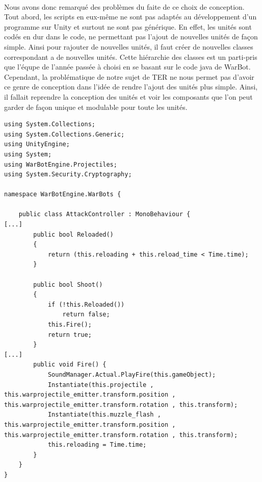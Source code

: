 \documentclass{report}
\begin{document}
\paragraph{} Nous avons donc remarqué des problèmes du faite de ce choix de conception. Tout abord, les scripts en eux-même ne sont pas adaptés au développement d'un programme sur Unity et surtout ne sont pas générique.  En effet, les unités sont codés en dur dans le code, ne permettant pas l'ajout de nouvelles unités de façon simple. Ainsi pour rajouter de nouvelles unités, il faut créer de nouvelles classes correspondant a de nouvelles unités. Cette hiérarchie des classes est un parti-pris que l'équpe de l'année passée à choisi en se basant sur le code java de WarBot. Cependant, la problématique de notre sujet de TER ne nous permet pas d'avoir ce genre de conception dans l'idée de rendre l'ajout des unités plus simple. Ainsi, il fallait reprendre la conception des unités et voir les composants que l'on peut garder de façon unique et modulable pour toute les unités.
\begin{lstlisting}[language={[Sharp]C}, caption= Code du script AttackController.cs de l'ancien projet]
using System.Collections;
using System.Collections.Generic;
using UnityEngine;
using System;
using WarBotEngine.Projectiles;
using System.Security.Cryptography;

namespace WarBotEngine.WarBots {

    public class AttackController : MonoBehaviour {
[...]
        public bool Reloaded()
        {
            return (this.reloading + this.reload_time < Time.time);
        }

        public bool Shoot()
        {
            if (!this.Reloaded())
                return false;
            this.Fire();
            return true;
        }
[...]
        public void Fire() {
            SoundManager.Actual.PlayFire(this.gameObject);
            Instantiate(this.projectile , this.warprojectile_emitter.transform.position , this.warprojectile_emitter.transform.rotation , this.transform);
            Instantiate(this.muzzle_flash , this.warprojectile_emitter.transform.position , this.warprojectile_emitter.transform.rotation , this.transform);
            this.reloading = Time.time;
        }
    }
}
\end{lstlisting}
\end{document}
